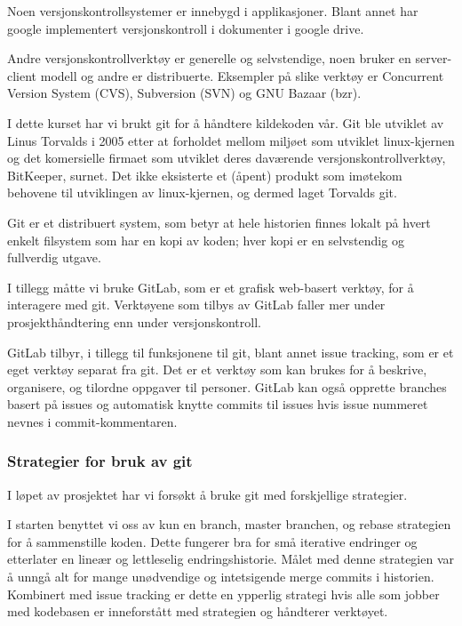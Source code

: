 \documentclass[12pt,a4paper]{article}
\begin{document}
Noen versjonskontrollsystemer er innebygd i applikasjoner. Blant annet
har google implementert versjonskontroll i dokumenter i google drive.

Andre versjonskontrollverktøy er generelle og selvstendige, noen bruker
en server-client modell og andre er distribuerte. Eksempler på slike
verktøy er Concurrent Version System (CVS), Subversion (SVN) og GNU
Bazaar (bzr).

I dette kurset har vi brukt git for å håndtere kildekoden vår.
Git ble utviklet av Linus Torvalds i 2005 etter at forholdet mellom miljøet som utviklet linux-kjernen og det komersielle firmaet som utviklet deres daværende versjonskontrollverktøy, BitKeeper, surnet.
Det ikke eksisterte et (åpent) produkt som imøtekom behovene til utviklingen av linux-kjernen, og dermed laget Torvalds git.\cite{historyOfGit}

Git er et distribuert system,
som betyr at hele historien finnes lokalt på hvert enkelt filsystem
som har en kopi av koden;
hver kopi er en selvstendig og fullverdig utgave.

I tillegg måtte vi bruke GitLab, som er et grafisk web-basert verktøy,
for å interagere med git. Verktøyene som tilbys av GitLab faller mer
under prosjekthåndtering enn under versjonskontroll.

GitLab tilbyr, i tillegg til funksjonene til git, blant annet issue
tracking, som er et eget verktøy separat fra git. Det er et verktøy som
kan brukes for å beskrive, organisere, og tilordne oppgaver til
personer. GitLab kan også opprette branches basert på issues og
automatisk knytte commits til issues hvis issue nummeret nevnes i
commit-kommentaren.

\subsubsection*{Strategier for bruk av git}

I løpet av prosjektet har vi forsøkt å bruke git med forskjellige
strategier.

I starten benyttet vi oss av kun en branch, master branchen, og rebase
strategien for å sammenstille koden. Dette fungerer bra for små
iterative endringer og etterlater en lineær og lettleselig
endringshistorie. Målet med denne strategien var å unngå alt for mange
unødvendige og intetsigende merge commits i historien. Kombinert med
issue tracking er dette en ypperlig strategi hvis alle som jobber med
kodebasen er inneforstått med strategien og håndterer verktøyet.
\end{document}

